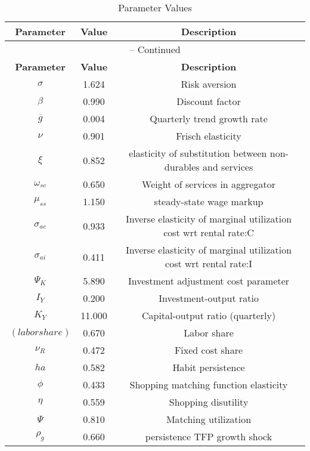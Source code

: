 \begin{center}
\begin{longtable}{ccc}
\caption{Parameter Values}\\%
\toprule%
\multicolumn{1}{c}{\textbf{Parameter}} &
\multicolumn{1}{c}{\textbf{Value}} &
 \multicolumn{1}{c}{\textbf{Description}}\\%
\midrule%
\endfirsthead
\multicolumn{3}{c}{{\tablename} \thetable{} -- Continued}\\%
\midrule%
\multicolumn{1}{c}{\textbf{Parameter}} &
\multicolumn{1}{c}{\textbf{Value}} &
  \multicolumn{1}{c}{\textbf{Description}}\\%
\midrule%
\endhead
${\sigma}$ 	 & 	 1.624 	 & 	 Risk aversion\\
${\beta}$ 	 & 	 0.990 	 & 	 Discount factor\\
${\overline{g}}$ 	 & 	 0.004 	 & 	 Quarterly trend growth rate\\
$\nu$ 	 & 	 0.901 	 & 	 Frisch elasticity\\
$\xi$ 	 & 	 0.852 	 & 	 elasticity of substitution between non-durables and services\\
$\omega_{sc}$ 	 & 	 0.650 	 & 	 Weight of services in aggregator\\
$\mu_{ss}$ 	 & 	 1.150 	 & 	 steady-state wage markup\\
${\sigma_{ac}}$ 	 & 	 0.933 	 & 	 Inverse elasticity of marginal utilization cost wrt rental rate:C\\
${\sigma_{ai}}$ 	 & 	 0.411 	 & 	 Inverse elasticity of marginal utilization cost wrt rental rate:I\\
${\Psi_{K}}$ 	 & 	 5.890 	 & 	 Investment adjustment cost parameter\\
${I_Y}$ 	 & 	 0.200 	 & 	 Investment-output ratio\\
${K_Y}$ 	 & 	 11.000 	 & 	 Capital-output ratio (quarterly)\\
$(labor share)$ 	 & 	 0.670 	 & 	 Labor share\\
${\nu_R}$ 	 & 	 0.472 	 & 	 Fixed cost share\\
${ha}$ 	 & 	 0.582 	 & 	 Habit persistence\\
${\phi}$ 	 & 	 0.433 	 & 	 Shopping matching function elasticity\\
${\eta}$ 	 & 	 0.559 	 & 	 Shopping disutility\\
${\Psi}$ 	 & 	 0.810 	 & 	 Matching utilization\\
${\rho_g}$ 	 & 	 0.660 	 & 	 persistence TFP growth shock\\

\end{longtable}
\end{center}
